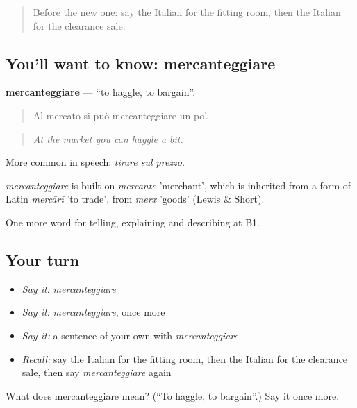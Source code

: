 \label{lesson:IT-C457-mercanteggiare}



\begin{quote}
Before the new one: say the Italian for the fitting room, then the Italian for the clearance sale.
\end{quote}

\subsection*{You'll want to know: mercanteggiare}
\textbf{mercanteggiare} — \textquotedblleft{}to haggle, to bargain\textquotedblright{}.

\begin{quote}
Al mercato si può mercanteggiare un po'.
\end{quote}

\begin{quote}
\emph{At the market you can haggle a bit.}
\end{quote}

More common in speech: \emph{tirare sul prezzo}.

\begin{cousinweb}
\emph{mercanteggiare} is built on \emph{mercante} 'merchant', which is inherited from a form of Latin \emph{mercārī} 'to trade', from \emph{merx} 'goods' (Lewis \& Short).
\end{cousinweb}

\begin{grammarlens}[title={What you've built}]
One more word for telling, explaining and describing at B1.
\end{grammarlens}

\subsection*{Your turn}
\begin{itemize}
\raggedright
  \item \emph{Say it:} \emph{mercanteggiare}
  \item \emph{Say it:} \emph{mercanteggiare}, once more
  \item \emph{Say it:} a sentence of your own with \emph{mercanteggiare}
  \item \emph{Recall:} say the Italian for the fitting room, then the Italian for the clearance sale, then say \emph{mercanteggiare} again
\end{itemize}

\begin{tcolorbox}[breakable,colback=teal!4,colframe=teal!35!black,title={Before you move on}]
What does mercanteggiare mean? (\textquotedblleft{}To haggle, to bargain\textquotedblright{}.) Say it once more.
\end{tcolorbox}
